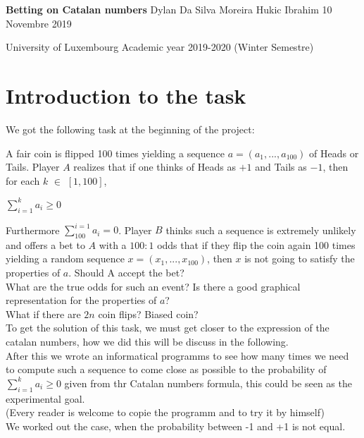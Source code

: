 \documentclass[a4paper,12pt,oneside]{article}
\begin{document}
 
\begin{titlepage}
\begin{center}
\vspace{10cm}
\hspace{0.5cm}
\newline
\Huge{\textbf{Betting on Catalan numbers}}
\vspace{1cm}
\newline 
\Large{\hspace{-2cm} Dylan Da Silva Moreira \hspace{3cm} Hukic Ibrahim}
\vspace{1cm}
\newline
\hspace{4cm} 10 Novembre 2019
\vspace{\fill}

\hspace{3cm}
\newline
University of Luxembourg
\vspace{0.5cm}
\newline
Academic year 2019-2020 (Winter Semestre)
\end{center}
\end{titlepage}
\newpage
 \tableofcontents{}
\newpage
\section{Introduction to the task}
We got the following task at the beginning of the project:

\vspace{1cm}
A fair coin is flipped 100 times yielding a sequence $a=(a_{1},...,a_{100})$ of Heads or Tails. Player $A$ realizes that if one thinks of Heads as $+1$ and Tails as $-1$, then for each $k$ $\in$ $[1,100]$,
\begin{center}
$\sum_{i=1}^{k}a_{i}\geq0$
\end{center}
Furthermore $\sum_{100}^{i=1}a_{i}=0$. Player $B$ thinks such a sequence is extremely unlikely and offers a bet to $A$ with a $100:1$ odds that if they flip the coin again 100 times yielding a random sequence $x=(x_{1},...,x_{100})$, then $x$ is not going to satisfy the properties of $a$. Should A accept the bet? \\What are the true odds for such an event? Is there a good graphical representation for the properties of $a$?\\What if there are $2n$ coin flips? Biased coin?
\vspace{0.5cm}
\\
To get the solution of this task, we must get closer to the expression of the catalan numbers, how we did this will be discuss in the following.
\vspace{0.5cm}
\\
After this we wrote an informatical programms to see how many times we need to compute such a sequence to come close as possible to the probability of $\sum_{i=1}^{k}a_{i}\geq0$ given from thr Catalan numbers formula, this could be seen as the experimental goal.
\\
(Every reader is welcome to copie the programm and to try it by himself)
\\
We worked out the case, when the probability between -1 and +1 is not equal.
\newpage
\end{document}
